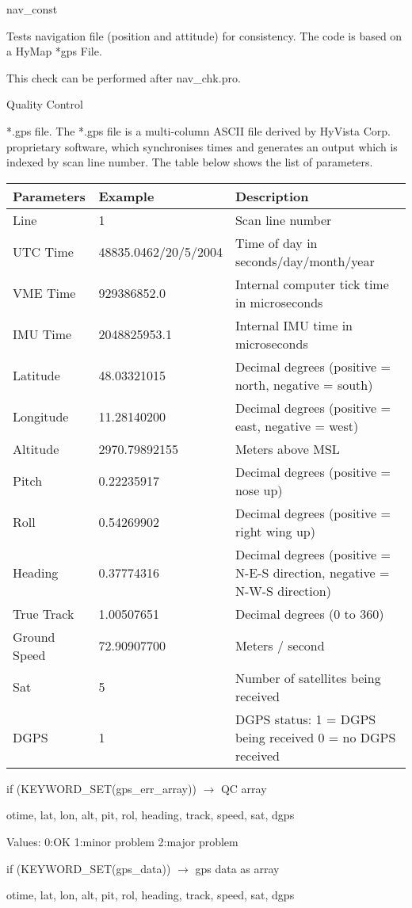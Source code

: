 %
{ %
nav\_const
}
%
{ %
Tests navigation file (position and attitude) for consistency. The code is based on a HyMap *gps File.

This check can be performed after nav\_chk.pro.
}
%
{ %
Quality Control
}
%
{ %
*.gps file. The *.gps file is a multi-column ASCII file derived by HyVista Corp. proprietary software, which synchronises times and generates an output which is indexed by scan line number. The table below shows the list of parameters. \bigskip

\begin{tabular}{l l p{7cm}}
Parameters & Example & Description \\ \hline
Line & 1 & Scan line number \\ 
UTC Time & 48835.0462/20/5/2004 & Time of day in seconds/day/month/year \\
VME Time & 929386852.0 & Internal computer tick time in microseconds \\
IMU Time & 2048825953.1 & Internal IMU time in microseconds \\
Latitude & 48.03321015 & Decimal degrees (positive = north, negative = south) \\
Longitude & 11.28140200 & Decimal degrees (positive = east, negative = west) \\
Altitude & 2970.79892155 & Meters above MSL \\
Pitch & 0.22235917 & Decimal degrees (positive = nose up) \\
Roll & 0.54269902 & Decimal degrees (positive = right wing up) \\
Heading & 0.37774316 & Decimal degrees (positive = N-E-S direction, negative = N-W-S direction) \\
True Track & 1.00507651 & Decimal degrees (0 to 360) \\
Ground Speed & 72.90907700 & Meters / second \\
Sat & 5 & Number of satellites being received \\
DGPS & 1 & DGPS status: 1 = DGPS being received 0 = no DGPS received 
\end{tabular}
}
%
{ %
 if (KEYWORD\_SET(gps\_err\_array)) $\rightarrow$ QC array

otime, lat, lon, alt, pit, rol, heading, track, speed, sat, dgps

Values: 0:OK    1:minor problem    2:major problem

if (KEYWORD\_SET(gps\_data)) $\rightarrow$ gps data as array

otime, lat, lon, alt, pit, rol, heading, track, speed, sat, dgps
}
